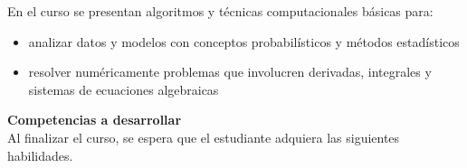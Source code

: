 \documentclass[letterpaper,10pt,onecolumn]{article}
\begin{document}
\noindent\normalsize En el curso se presentan
algoritmos y t\'ecnicas computacionales b\'asicas para:

\begin{itemize}
\item analizar datos y modelos con conceptos probabil\'isticos y
  m\'etodos estad\'isticos \\[-0.6cm] 
\item resolver num\'ericamente problemas que involucren derivadas,
  integrales y sistemas de ecuaciones algebraicas \\[-0.6cm]
\end{itemize} 
\vspace*{0.5cm} 

\noindent\textbf{\large {} \quad Competencias a
  desarrollar}\\[-0.2cm] 


\noindent\normalsize Al finalizar el curso, se espera que el
estudiante adquiera las siguientes habilidades. 
\end{document}
